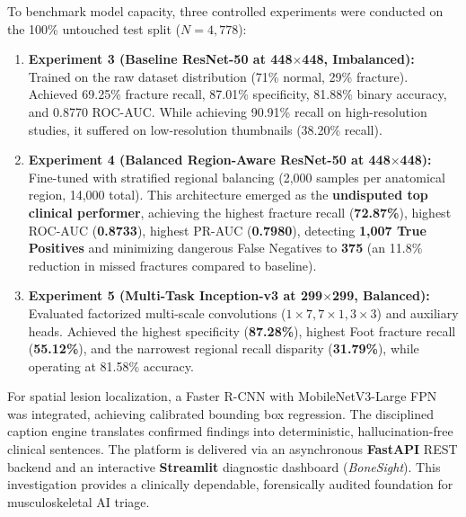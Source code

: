 \documentclass[12pt, a4paper]{report}
\begin{document}
To benchmark model capacity, three controlled experiments were conducted on the 100\% untouched test split ($N=4,778$):
\begin{enumerate}[leftmargin=*]
    \item \textbf{Experiment 3 (Baseline ResNet-50 at 448$\times$448, Imbalanced):} Trained on the raw dataset distribution (71\% normal, 29\% fracture). Achieved 69.25\% fracture recall, 87.01\% specificity, 81.88\% binary accuracy, and 0.8770 ROC-AUC. While achieving 90.91\% recall on high-resolution studies, it suffered on low-resolution thumbnails (38.20\% recall).
    \item \textbf{Experiment 4 (Balanced Region-Aware ResNet-50 at 448$\times$448):} Fine-tuned with stratified regional balancing (2,000 samples per anatomical region, 14,000 total). This architecture emerged as the \textbf{undisputed top clinical performer}, achieving the highest fracture recall (\textbf{72.87\%}), highest ROC-AUC (\textbf{0.8733}), highest PR-AUC (\textbf{0.7980}), detecting \textbf{1,007 True Positives} and minimizing dangerous False Negatives to \textbf{375} (an 11.8\% reduction in missed fractures compared to baseline).
    \item \textbf{Experiment 5 (Multi-Task Inception-v3 at 299$\times$299, Balanced):} Evaluated factorized multi-scale convolutions ($1\times 7, 7\times 1, 3\times 3$) and auxiliary heads. Achieved the highest specificity (\textbf{87.28\%}), highest Foot fracture recall (\textbf{55.12\%}), and the narrowest regional recall disparity (\textbf{31.79\%}), while operating at 81.58\% accuracy.
\end{enumerate}

For spatial lesion localization, a Faster R-CNN with MobileNetV3-Large FPN was integrated, achieving calibrated bounding box regression. The disciplined caption engine translates confirmed findings into deterministic, hallucination-free clinical sentences. The platform is delivered via an asynchronous \textbf{FastAPI} REST backend and an interactive \textbf{Streamlit} diagnostic dashboard (\textit{BoneSight}). This investigation provides a clinically dependable, forensically audited foundation for musculoskeletal AI triage.

\newpage
\tableofcontents

\newpage
\listoffigures

\newpage
\listoftables
\end{document}
